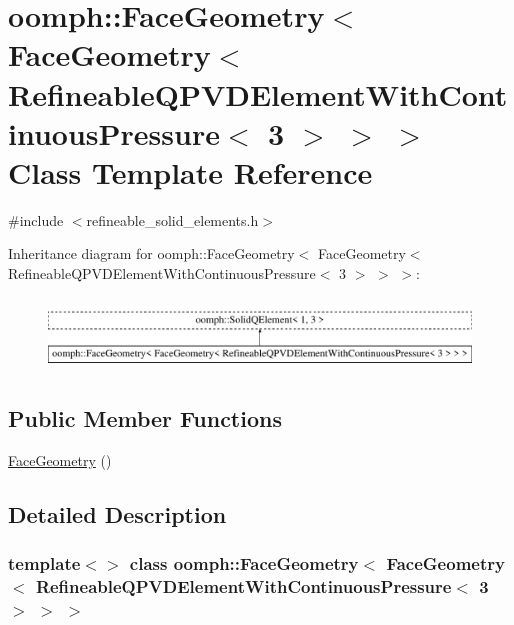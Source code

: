 \hypertarget{classoomph_1_1FaceGeometry_3_01FaceGeometry_3_01RefineableQPVDElementWithContinuousPressure_3_013_01_4_01_4_01_4}{}\section{oomph\+:\+:Face\+Geometry$<$ Face\+Geometry$<$ Refineable\+Q\+P\+V\+D\+Element\+With\+Continuous\+Pressure$<$ 3 $>$ $>$ $>$ Class Template Reference}
\label{classoomph_1_1FaceGeometry_3_01FaceGeometry_3_01RefineableQPVDElementWithContinuousPressure_3_013_01_4_01_4_01_4}


{\ttfamily \#include $<$refineable\+\_\+solid\+\_\+elements.\+h$>$}

Inheritance diagram for oomph\+:\+:Face\+Geometry$<$ Face\+Geometry$<$ Refineable\+Q\+P\+V\+D\+Element\+With\+Continuous\+Pressure$<$ 3 $>$ $>$ $>$\+:\begin{figure}[H]
\begin{center}
\leavevmode
\includegraphics[height=1.911263cm]{classoomph_1_1FaceGeometry_3_01FaceGeometry_3_01RefineableQPVDElementWithContinuousPressure_3_013_01_4_01_4_01_4}
\end{center}
\end{figure}
\subsection*{Public Member Functions}
\begin{DoxyCompactItemize}
\item 
\hyperlink{classoomph_1_1FaceGeometry_3_01FaceGeometry_3_01RefineableQPVDElementWithContinuousPressure_3_013_01_4_01_4_01_4_a40e756f4f92c70ec09f1cb09883d7c95}{Face\+Geometry} ()
\end{DoxyCompactItemize}


\subsection{Detailed Description}
\subsubsection*{template$<$$>$\newline
class oomph\+::\+Face\+Geometry$<$ Face\+Geometry$<$ Refineable\+Q\+P\+V\+D\+Element\+With\+Continuous\+Pressure$<$ 3 $>$ $>$ $>$}

